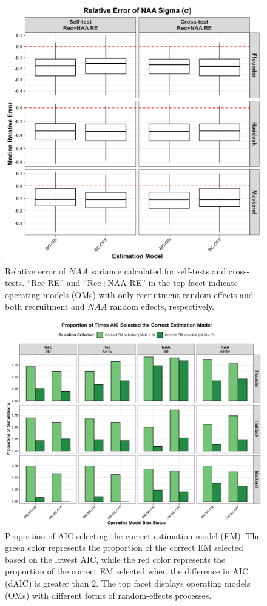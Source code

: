 \documentclass[
  12pt,
]{article}
\begin{document}
\begin{figure}[H]
\centering
\includegraphics[width=\textwidth]{Revised_Figures&Tables/NAA_sigma.PNG}
\caption{Relative error of $NAA$ variance calculated for self-tests and cross-tests. ``Rec RE'' and ``Rec+NAA RE'' in the top facet indicate operating models (OMs) with only recruitment random effects and both recruitment and $NAA$ random effects, respectively.}
\label{fig:NAA_sigma}
\end{figure}

\begin{figure}[H]
\centering
\includegraphics[width=\textwidth]{Revised_Figures&Tables/AIC_select.PNG}
\caption{Proportion of AIC selecting the correct estimation model (EM). The green color represents the proportion of the correct EM selected based on the lowest AIC, while the red color represents the proportion of the correct EM selected when the difference in AIC (dAIC) is greater than 2. The top facet displays operating models (OMs) with different forms of random-effects processes.}
\label{fig:AIC_select}
\end{figure}
\end{document}

